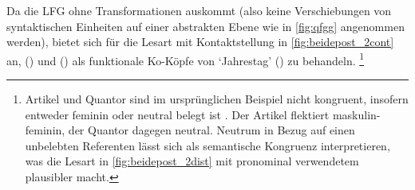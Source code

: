 
Da die LFG ohne Transformationen auskommt (also keine Verschiebungen von
syntaktischen Einheiten auf einer abstrakten Ebene wie in \cref{fig:qfgg}
angenommen werden), bietet sich für die Lesart mit Kontaktstellung in
\cref{fig:beidepost_2cont} an,  () und 
() als funktionale Ko-Köpfe von  `Jahrestag' ()
zu behandeln.%
%
	\footnote{Artikel und Quantor sind im ursprünglichen Beispiel nicht
		kongruent, insofern  entweder feminin oder neutral belegt
		ist \autocite[s.\,v.~]{lexer:mhdhwb}. Der Artikel 
		flektiert maskulin-feminin, der Quantor  dagegen neutral.
		Neutrum in Bezug auf einen unbelebten Referenten lässt sich als
		semantische Kongruenz interpretieren, was die Lesart in
		\cref{fig:beidepost_2dist} mit pronominal verwendetem 
		plausibler macht.}

